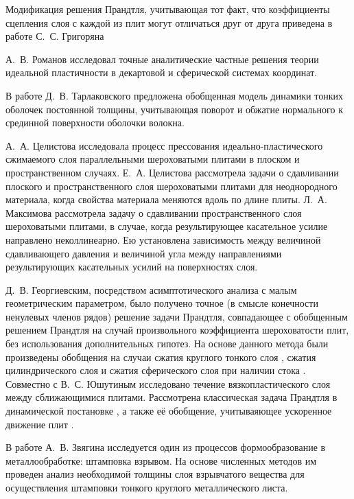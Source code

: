 Модификация решения Прандтля, учитывающая тот факт, что коэффициенты сцепления слоя с каждой из плит могут отличаться друг от друга приведена в работе С.~С. Григоряна \autocite{Grigoryan:1981} 

А.~В. Романов \autocite{Romanov:1982,Romanov:1984} исследовал точные аналитические частные решения теории идеальной пластичности в декартовой и сферической системах координат.

В работе Д.~В. Тарлаковского \autocite{Tarlakovskiy:2018} предложена обобщенная модель динамики тонких оболочек постоянной толщины, учитывающая поворот и обжатие нормального к срединной поверхности оболочки волокна.

А.~А. Целистова \autocite{Tselistova:1999} исследовала процесс прессования идеально-пластического сжимаемого слоя параллельными шероховатыми плитами в плоском и пространственном случаях.
Е.~А. Целистова \autocite{Tselistova:2000} рассмотрела задачи о сдавливании плоского и пространственного слоя шероховатыми плитами для неоднородного материала, когда свойства материала меняются вдоль по длине плиты.
Л.~А. Максимова \autocite{Maximova:1999} рассмотрела задачу о сдавливании пространственного слоя шероховатыми плитами, в случае, когда результирующее касательное усилие направлено неколлинеарно. Ею установлена зависимость между величиной сдавливающего давления и величиной угла между направлениями результирующих касательных усилий на поверхностях слоя.

Д.~В. Георгиевским, посредством асимптотического анализа с малым геометрическим параметром, было получено точное (в смысле конечности ненулевых членов рядов) решение \autocite{Georgievsky:2009} задачи Прандтля, совпадающее с обобщенным решением Прандтля на случай произвольного коэффициента шероховатости плит, без использования дополнительных гипотез. На основе данного метода были произведены обобщения на случаи сжатия круглого тонкого слоя \autocite{Georgievsky:2008}, сжатия цилиндрического слоя \autocite{Georgievsky:2010} и сжатия сферического слоя при наличии стока \autocite{Georgievsky:2011}. Совместно с В.~С. Юшутиным \autocite{Georgievsky:2012} исследовано течение вязкопластического слоя между сближающимися плитами. Рассмотрена классическая задача Прандтля в динамической постановке \autocite{Georgievsky:2013}, а также её обобщение, учитываяющее ускоренное движение плит \autocite{Georgievsky:2019}.

В работе А.~В. Звягина \autocite{Zvyagin:1990} исследуется один из процессов формообразование в металлообработке: штамповка взрывом. На основе численных методов им проведен анализ необходимой толщины слоя взрывчатого вещества для осуществления штамповки тонкого круглого металлического листа.

